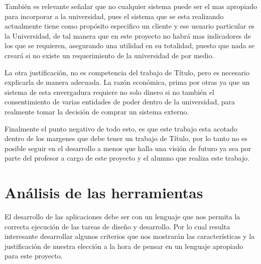 \documentclass[a4paper,12pt,openany,oneside]{book}
\begin{document}
También es relevante señalar que no cualquier sistema puede ser el mas apropiado para incorporar a la universidad, pues el sistema que se esta realizando actualmente tiene como propósito especifico un cliente y ese usuario particular es la Universidad, de tal manera que en este proyecto no habrá mas indicadores de los que se requieren, asegurando una utilidad en su totalidad, puesto que nada se creará si no existe un requerimiento de la universidad de por medio.

La otra justificación, no es competencia del trabajo de Título, pero es necesario explicarla de manera adecuada. La razón económica, prima por otras ya que un sistema de esta envergadura requiere no solo dinero si no también el consentimiento de varias entidades de poder dentro de la universidad, para realmente tomar la decisión de comprar un sistema externo.

Finalmente el punto negativo de todo esto, es que este trabajo esta acotado dentro de los margenes que debe tener un trabajo de Título, por lo tanto no es posible seguir en el desarrollo a menos que halla una visión de futuro ya sea por parte del profesor a cargo de este proyecto y el alumno que realiza este trabajo.
\section{Análisis de las herramientas}
El desarrollo de las aplicaciones debe ser con un lenguaje que nos permita la correcta ejecución de las tareas de diseño y desarrollo. Por lo cual resulta interesante desarrollar algunos criterios que nos mostrarán las características y la justificación de nuestra elección a la hora de pensar en un lenguaje apropiado para este proyecto.
\end{document}
